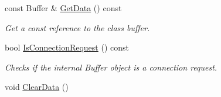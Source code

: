 \begin{DoxyCompactItemize}
const Buffer \& \hyperlink{classrbp_1_1Command_a0c77a911ee6c10c4cd65c037d42b07e2}{Get\+Data} () const 
\begin{DoxyCompactList}\small\item\em Get a const reference to the class buffer. \end{DoxyCompactList}\item 
bool \hyperlink{classrbp_1_1Command_a0142edcedaf6eca67e9862b53071e64c}{Is\+Connection\+Request} () const 
\begin{DoxyCompactList}\small\item\em Checks if the internal Buffer object is a connection request. \end{DoxyCompactList}\item 
\hypertarget{classrbp_1_1Command_aade1df23a736c998e6d0dd4757a3b5b3}{}void \hyperlink{classrbp_1_1Command_aade1df23a736c998e6d0dd4757a3b5b3}{Clear\+Data} ()\label{classrbp_1_1Command_aade1df23a736c998e6d0dd4757a3b5b3}


\end{DoxyCompactItemize}
